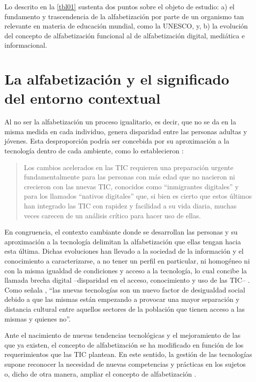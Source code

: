 \documentclass{textolivre}
\begin{document}
Lo descrito en la \cref{tbl01} sustenta dos puntos sobre el objeto de estudio: a) el fundamento y trascendencia de la alfabetización por parte de un organismo tan relevante en materia de educación mundial, como la UNESCO, y, b) la evolución del concepto de alfabetización funcional al de alfabetización digital, mediática e informacional.

\section{La alfabetización y el significado del entorno contextual}\label{sec-conceito}
Al no ser la alfabetización un proceso igualitario, es decir, que no se da en la misma medida en cada individuo, genera disparidad entre las personas adultas y jóvenes. Esta desproporción podría ser concebida por su aproximación a la tecnología dentro de cada ambiente, como lo establecieron \textcite[p. 451]{avello__martinez_evolucion_2015}:

\begin{quote}
    Los cambios acelerados en las TIC requieren una preparación urgente fundamentalmente para las personas con más edad que no nacieron ni crecieron con las nuevas TIC, conocidos como “inmigrantes digitales” y para los llamados “nativos digitales” que, si bien es cierto que estos últimos han integrado las TIC con rapidez y facilidad a su vida diaria, muchas veces carecen de un análisis crítico para hacer uso de ellas.
\end{quote}

En congruencia, el contexto cambiante donde se desarrollan las personas y su aproximación a la tecnología delimitan la alfabetización que ellas tengan hacia esta última. Dichas evoluciones han llevado a la sociedad de la información y el conocimiento a caracterizarse, a no tener un perfil en particular, ni homogéneo ni con la misma igualdad de condiciones y acceso a la tecnología, lo cual concibe la llamada brecha digital –disparidad en el acceso, conocimiento y uso de las TIC– \cite{uribe_tirado_acceso_2004}. Como señala \textcite[p. 57]{area_moreira_alfabetizacion_2014}, “las nuevas tecnologías son un nuevo factor de desigualdad social debido a que las mismas están empezando a provocar una mayor separación y distancia cultural entre aquellos sectores de la población que tienen acceso a las mismas y quienes no”. 

Ante el nacimiento de nuevas tendencias tecnológicas y el mejoramiento de las que ya existen, el concepto de alfabetización se ha modificado en función de los requerimientos que las TIC plantean. En este sentido, la gestión de las tecnologías supone reconocer la necesidad de nuevas competencias y prácticas en los sujetos o, dicho de otra manera, ampliar el concepto de alfabetización \cite{ruiz_requies_formar_2010}.
\end{document}
